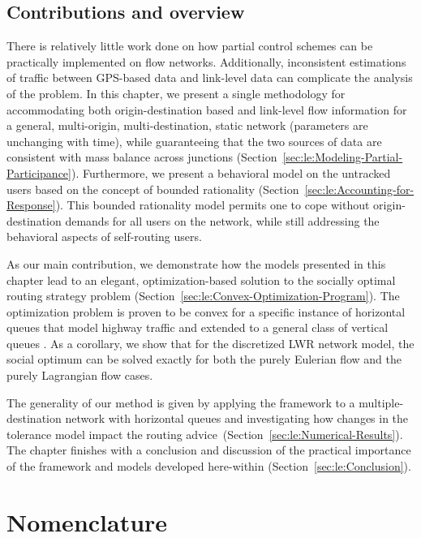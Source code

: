 \subsection{Contributions and overview\label{sub:Contributions-and-overview}}

There is relatively little work done on how partial control schemes
can be practically implemented on flow networks. Additionally, inconsistent
estimations of traffic between GPS-based data and link-level data
can complicate the analysis of the problem. In this chapter, we present
a single methodology for accommodating both origin-destination based
and link-level flow information for a general, multi-origin, multi-destination,
static network (parameters are unchanging with time), while guaranteeing
that the two sources of data are consistent with mass balance across
junctions (Section~\ref{sec:le:Modeling-Partial-Participance}). Furthermore,
we present a behavioral model on the untracked users based on the
concept of bounded rationality (Section~\ref{sec:le:Accounting-for-Response}).
This bounded rationality model permits one to cope without origin-destination
demands for all users on the network, while still addressing the behavioral
aspects of self-routing users. 

As our main contribution, we demonstrate how the models presented
in this chapter lead to an elegant, optimization-based solution to
the socially optimal routing strategy problem (Section~\ref{sec:le:Convex-Optimization-Program}).
The optimization problem is proven to be convex for a specific instance
of horizontal queues that model highway traffic and extended to a
general class of vertical queues . As a corollary, we show that for
the discretized LWR network model, the social optimum can be solved
exactly for both the purely Eulerian flow and the purely Lagrangian
flow cases. 

The generality of our method is given by applying the framework to
a multiple-destination network with horizontal queues and investigating
how changes in the tolerance model impact the routing advice~(Section~\ref{sec:le:Numerical-Results}).
The chapter finishes with a conclusion and discussion of the practical
importance of the framework and models developed here-within (Section~\ref{sec:le:Conclusion}).


\section*{Nomenclature}
\label{sec:le:Nomenclature}

